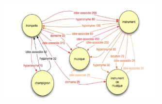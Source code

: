 \documentclass{beamer}
\begin{document}
\begin{frame}
\begin{figure}
 \begin{minipage}{\textwidth}
\centering 
       \includegraphics[width=0.75\textwidth]{img/jdm.jpeg}
    \end{minipage}
\end{figure}
\end{frame}
\end{document}
